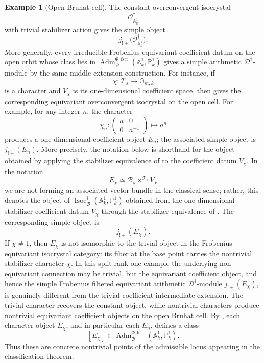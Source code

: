 \documentclass[11pt]{amsart}
\theoremstyle{plain}
\theoremstyle{definition}
\newtheorem{example}{Example}[section]
\theoremstyle{remark}
\newcommand{\Isoc}{\operatorname{Isoc}}
\newcommand{\fstr}{\mathrm{fstr}}
\newcommand{\Adm}{\operatorname{Adm}}
\begin{document}
\begin{example}[Open Bruhat cell]
The constant overconvergent isocrystal
\[
  \mathcal O^\dagger_{\mathbb A^1_k}
\]
with trivial stabilizer action gives the simple object
\[
  j_{!+}\bigl(\mathcal O^\dagger_{\mathbb A^1_k}\bigr).
\]
More generally, every irreducible Frobenius equivariant coefficient
datum on the open orbit whose class lies in
\(\Adm^{\Phi,\fstr}_{\mathcal B}(\mathbb A^1_k,\mathbb P^1_k)\) gives a simple arithmetic
\(\mathscr D^\dagger\)-module by the same middle-extension construction. For instance, if
\[
  \chi:\mathcal T_s\longrightarrow \mathbb G_{m,k}
\]
is a character and \(V_\chi\) is its one-dimensional coefficient space, then
 gives the corresponding equivariant
overconvergent isocrystal on the open cell.  For example, for any integer
\(n\), the character
\[
  \chi_n:
  \begin{pmatrix}a&0\\0&a^{-1}\end{pmatrix}
  \longmapsto a^n
\]
produces a one-dimensional coefficient object \(E_n\); the associated simple
object is \(j_{!+}(E_n)\). More precisely, the notation below
is shorthand for the object obtained by applying the stabilizer equivalence of
 to the coefficient datum \(V_\chi\). In the
notation
\[
  E_\chi\simeq \mathcal B_s\times^{\mathcal T_s}V_\chi
\]
we are not forming an associated vector bundle in the classical sense; rather,
this denotes the object of
\(\Isoc^{\dagger}_{\mathcal B}(\mathbb A^1_k,\mathbb P^1_k)\) obtained from
the one-dimensional stabilizer coefficient datum \(V_\chi\) through the
stabilizer equivalence of . The corresponding
simple object is
\[
  j_{!+}(E_\chi).
\]
If \(\chi\neq1\), then \(E_\chi\) is not isomorphic to the trivial object
in the Frobenius equivariant isocrystal category: its fiber at the base point carries the
nontrivial stabilizer character \(\chi\).  In this split rank-one example the
underlying non-equivariant connection may be trivial, but the equivariant
coefficient object, and hence the simple Frobenius filtered equivariant arithmetic
\(\mathscr D^\dagger\)-module \(j_{!+}(E_\chi)\), is genuinely different
from the trivial-coefficient intermediate extension.  The trivial character
recovers the constant object, while nontrivial characters produce nontrivial
equivariant coefficient objects on the open Bruhat cell.  By
, each character object \(E_\chi\), and in particular each
\(E_n\), defines a class
\[
  [E_\chi]\in
  \Adm^{\Phi,\fstr}_{\mathcal B}(\mathbb A^1_k,\mathbb P^1_k).
\]
Thus these are concrete nontrivial points of the admissible locus appearing in
the classification theorem.
\end{example}
\end{document}
